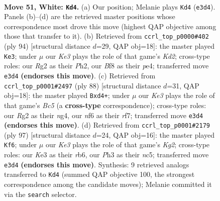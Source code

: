\documentclass[11pt]{article}
\begin{document}
\clearpage

\begin{figure}[p]\centering
\begin{subfigure}{0.46\textwidth}\centering
\resizebox{\linewidth}{!}{%
\newchessgame
\chessboard[
  setfen={5B2/1r3p1k/5n2/8/p3p2p/P3K2P/5PR1/8 w - - 2 51},
  showmover=false,
  pgfstyle=straightmove, color=movearrow, markmove={e3-d4}
]}
\caption{}
\end{subfigure}\hfill
\begin{subfigure}{0.46\textwidth}\centering
\resizebox{\linewidth}{!}{%
\newchessgame
\chessboard[
  setfen={8/6k1/8/pB2np2/P1p1p3/2P5/1P1K3P/8 w - - 0 48},
  showmover=false,
  pgfstyle=straightmove, color=movearrow, markmove={d2-e3}
]}
\caption{}
\end{subfigure}
\\[4pt]
\begin{subfigure}{0.46\textwidth}\centering
\resizebox{\linewidth}{!}{%
\newchessgame
\chessboard[
  setfen={4R3/1p3rk1/8/1pB3p1/1P1p2n1/6P1/1P4K1/8 w - - 0 45},
  showmover=false,
  pgfstyle=straightmove, color=movearrow, markmove={c5-d4}
]}
\caption{}
\end{subfigure}\hfill
\begin{subfigure}{0.46\textwidth}\centering
\resizebox{\linewidth}{!}{%
\newchessgame
\chessboard[
  setfen={4r3/6k1/1Rp4p/2Nb1PpP/P2P4/8/5K2/8 b - - 0 49},
  showmover=false,
  pgfstyle=straightmove, color=movearrow, markmove={g7-f6}
]}
\caption{}
\end{subfigure}
\caption{\textbf{Move 51, White: \texttt{Kd4}.} (a) Our position; Melanie plays \texttt{Kd4} (\texttt{e3d4}). Panels (b)--(d) are the retrieved master positions whose correspondence most drove this move (highest QAP objective among those that transfer to it). (b) Retrieved from \texttt{ccrl\_top\_p0000\#402} (ply 94) [structural distance $d$=29, QAP obj=18]: the master played \texttt{Ke3}; under $\mu$ our \emph{Ke3} plays the role of that game's \emph{Kd2}; cross-type roles: our \emph{R}g2 as their \emph{P}h2, our \emph{B}f8 as their \emph{p}e4; transferred move \texttt{e3d4} \textbf{(endorses this move)}. (c) Retrieved from \texttt{ccrl\_top\_p0001\#2497} (ply 88) [structural distance $d$=31, QAP obj=18]: the master played \texttt{Bxd4+}; under $\mu$ our \emph{Ke3} plays the role of that game's \emph{Bc5} (a \textbf{cross-type} correspondence); cross-type roles: our \emph{R}g2 as their \emph{n}g4, our \emph{n}f6 as their \emph{r}f7; transferred move \texttt{e3d4} \textbf{(endorses this move)}. (d) Retrieved from \texttt{ccrl\_top\_p0001\#2179} (ply 97) [structural distance $d$=24, QAP obj=16]: the master played \texttt{Kf6}; under $\mu$ our \emph{Ke3} plays the role of that game's \emph{Kg2}; cross-type roles: our \emph{K}e3 as their \emph{r}b6, our \emph{P}h3 as their \emph{n}c5; transferred move \texttt{e3d4} \textbf{(endorses this move)}. Synthesis: 9 retrieved analogs transferred to \texttt{Kd4} (summed QAP objective 100, the strongest correspondence among the candidate moves); Melanie committed it via the \texttt{search} selector.}
\label{fig:thought-m100}
\end{figure}
\end{document}
